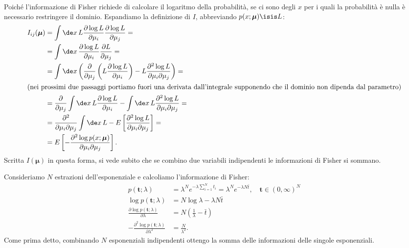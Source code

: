 Poiché l'informazione di Fisher richiede di calcolare il logaritmo della probabilità,
se ci sono degli $x$ per i quali la probabilità è nulla
è necessario restringere il dominio.
Espandiamo la definizione di $I$, abbreviando $p(x;\boldsymbol\mu)\isis L$:
\begin{align*}
	I_{ij}(\boldsymbol\mu)
	&= \int\de x\, L
	\frac{\partial\log L}{\partial\mu_i}
	\frac{\partial\log L}{\partial\mu_j} = \\
	&= \int\de x\,
	\frac{\partial\log L}{\partial\mu_i}
	\frac{\partial L}{\partial\mu_j} = \\
	&= \int\de x \left(
	\frac{\partial}{\partial\mu_j} \left( L \frac{\partial\log L}{\partial\mu_i} \right)
	- L \frac{\partial^2\log L}{\partial\mu_i\partial\mu_j} \right) = \\
	\intertext{(nei prossimi due passaggi portiamo fuori una derivata dall'integrale supponendo che il dominio non dipenda dal parametro)}
	&= \frac{\partial}{\partial\mu_j} \int\de x\, L \frac{\partial\log L}{\partial\mu_i}
	- \int\de x\, L \frac{\partial^2\log L}{\partial\mu_i\partial\mu_j} = \\
	&= \frac{\partial^2}{\partial\mu_i\partial\mu_j} \int\de x\, L
	- E \left[ \frac{\partial^2\log L}{\partial\mu_i\partial\mu_j} \right] = \\
	&= E \left[ -\frac{\partial^2\log p(x;\boldsymbol\mu)}{\partial\mu_i\partial\mu_j} \right].
\end{align*}
Scritta $I(\boldsymbol\mu)$ in questa forma,
si vede subito che se combino due variabili indipendenti le informazioni di Fisher si sommano.

\begin{example}
	Consideriamo $N$ estrazioni dell'esponenziale e calcoliamo l'informazione di Fisher:
	\begin{align*}
		p(\mathbf t;\lambda)
		&= \lambda^N e^{-\lambda\sum_{i=1}^N t_i}
		= \lambda^N e^{-\lambda N \bar t}, \quad \mathbf t\in(0,\infty)^N \\
		\log p(\mathbf t;\lambda)
		&= N\log\lambda - \lambda N\bar t \\
		\frac{\partial \log p(\mathbf t;\lambda)}{\partial\lambda}
		&= N \left( \frac1\lambda - \bar t \right) \\
		-\frac{\partial^2 \log p(\mathbf t;\lambda)}{\partial\lambda^2}
		&= \frac N{\lambda^2}.
	\end{align*}
	Come prima detto, combinando $N$ esponenziali indipendenti ottengo la somma delle informazioni delle singole esponenziali.
\end{example}

